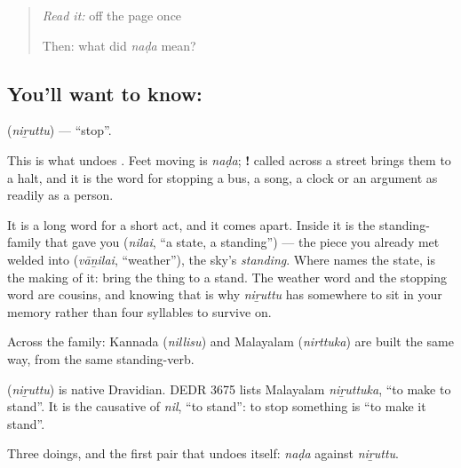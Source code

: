 \begin{quote}
\emph{Read it:} \textbf{} off the page once

Then: what did \emph{naḍa} mean?
\end{quote}

\subsection*{You'll want to know: }
\textbf{} (\emph{niṟuttu}) — \textquotedblleft{}stop\textquotedblright{}.

This is what undoes . Feet moving is \emph{naḍa}; \textbf{!} called across a street brings them to a halt, and it is the word for stopping a bus, a song, a clock or an argument as readily as a person.

It is a long word for a short act, and it comes apart. Inside it is the standing-family that gave you \textbf{} (\emph{nilai}, \textquotedblleft{}a state, a standing\textquotedblright{}) — the piece you already met welded into  (\emph{vāṉilai}, \textquotedblleft{}weather\textquotedblright{}), the sky's \emph{standing}. Where  names the state,  is the making of it: bring the thing to a stand. The weather word and the stopping word are cousins, and knowing that is why \emph{niṟuttu} has somewhere to sit in your memory rather than four syllables to survive on.

Across the family: Kannada  (\emph{nillisu}) and Malayalam  (\emph{nirttuka}) are built the same way, from the same standing-verb.

\begin{cousinweb}
\textbf{} (\emph{niṟuttu}) is native Dravidian. DEDR 3675 lists Malayalam \emph{niṟuttuka}, \textquotedblleft{}to make to stand\textquotedblright{}. It is the causative of \emph{nil}, \textquotedblleft{}to stand\textquotedblright{}: to stop something is \textquotedblleft{}to make it stand\textquotedblright{}.
\end{cousinweb}

\begin{grammarlens}[title={What you've built}]
Three doings, and the first pair that undoes itself: \emph{naḍa} against \emph{niṟuttu}.
\end{grammarlens}

